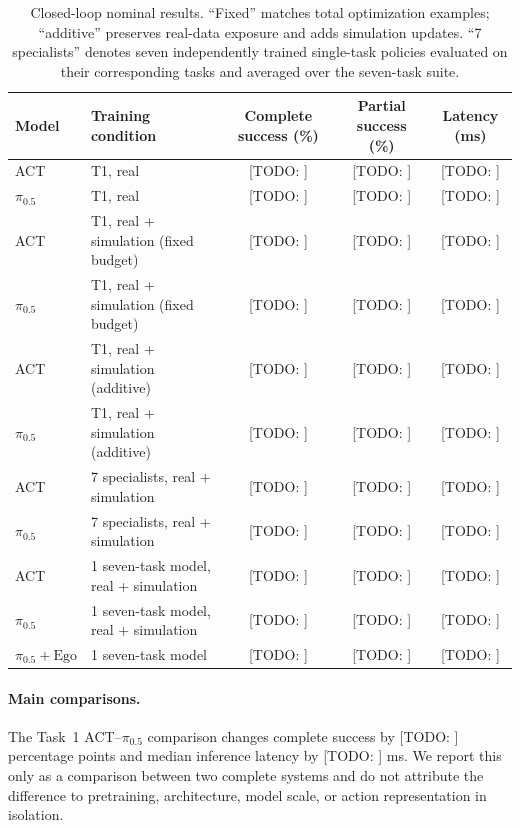 \documentclass[10pt,conference]{IEEEtran}
\newcommand{\TODO}[1]{\textcolor{red!70!black}{[TODO: #1]}}
\begin{document}
\begin{table}[t]
\centering
\small
\caption{Closed-loop nominal results. ``Fixed'' matches total optimization
examples; ``additive'' preserves real-data exposure and adds simulation updates.
``7 specialists'' denotes seven independently trained single-task policies
evaluated on their corresponding tasks and averaged over the seven-task suite.}
\label{tab:main-results}
\begin{tabular}{@{}llccc@{}}
\toprule
Model & Training condition &
Complete success (\%) &
Partial success (\%) &
Latency (ms) \\
\midrule
ACT & T1, real
    & \TODO{} & \TODO{} & \TODO{} \\
$\pi_{0.5}$ & T1, real
    & \TODO{} & \TODO{} & \TODO{} \\
ACT & T1, real + simulation (fixed budget)
    & \TODO{} & \TODO{} & \TODO{} \\
$\pi_{0.5}$ & T1, real + simulation (fixed budget)
    & \TODO{} & \TODO{} & \TODO{} \\
ACT & T1, real + simulation (additive)
    & \TODO{} & \TODO{} & \TODO{} \\
$\pi_{0.5}$ & T1, real + simulation (additive)
    & \TODO{} & \TODO{} & \TODO{} \\
ACT & 7 specialists, real + simulation
    & \TODO{} & \TODO{} & \TODO{} \\
$\pi_{0.5}$ & 7 specialists, real + simulation
    & \TODO{} & \TODO{} & \TODO{} \\
ACT & 1 seven-task model, real + simulation
    & \TODO{} & \TODO{} & \TODO{} \\
$\pi_{0.5}$ & 1 seven-task model, real + simulation
    & \TODO{} & \TODO{} & \TODO{} \\
$\pi_{0.5}+\mathrm{Ego}$ & 1 seven-task model
    & \TODO{} & \TODO{} & \TODO{} \\
\bottomrule
\end{tabular}
\end{table}

\paragraph{Main comparisons.}
The Task~1 ACT--$\pi_{0.5}$ comparison changes complete success by \TODO{}
percentage points and median inference latency by \TODO{} ms. We report this
only as a comparison between two complete systems and do not attribute the
difference to pretraining, architecture, model scale, or action representation
in isolation.
\end{document}
